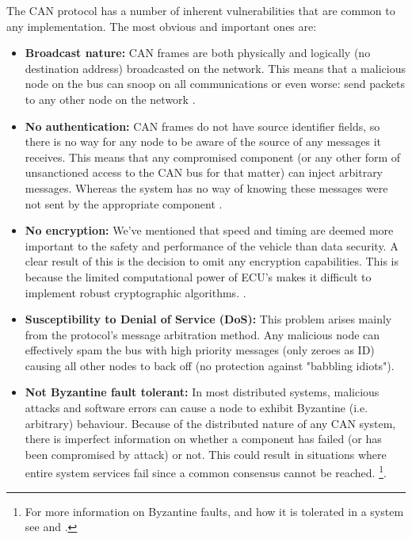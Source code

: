 The CAN protocol has a number of inherent vulnerabilities that are common to any implementation. The most obvious and important ones are:

\begin{itemize}
	\item \textbf{Broadcast nature:} CAN frames are both physically and logically (no destination address) broadcasted on the network. This means that a malicious node on the bus can snoop on all communications or even worse: send packets to any other node on the network \cite{Kosher}. 
	
	\item \textbf{No authentication:} CAN frames do not have source identifier fields, so there is no way for any node to be aware of the source of any messages it receives. This means that any compromised component (or any other form of unsanctioned access to the CAN bus for that matter) can inject arbitrary messages. Whereas the system has no way of knowing these messages were not sent by the appropriate component \cite{Kosher}\cite{CANissues}.
	
	\item \textbf{No encryption:} We've mentioned that speed and timing are deemed more important to the safety and performance of the vehicle than data security. A clear result of this is the decision to omit any encryption capabilities. This is because the limited  computational power of ECU's makes it difficult to implement robust cryptographic algorithms. \cite{CANissues}.  
	
	\item \textbf{Susceptibility to Denial of Service (DoS):} This problem arises mainly from the protocol's message arbitration method. Any malicious node can effectively spam the bus with high priority messages (only zeroes as ID) causing all other nodes to back off (no protection against "babbling idiots"\cite{Pike15})\cite{Kosher}.
	
	\item \textbf{Not Byzantine fault tolerant:} In most distributed systems, malicious attacks and software errors can cause a node to exhibit Byzantine (i.e. arbitrary) behaviour\cite{Byzantine}. Because of the distributed nature of any CAN system, there is imperfect information on whether a component has failed (or has been compromised by attack) or not. This could result in situations where entire system services fail since a common consensus cannot be reached\cite{wiki:ByzantineFault}. \footnote{For more information on Byzantine faults, and how it is tolerated in a system see \cite{Byzantine} and \cite{wiki:ByzantineFault}.}.
	
\end{itemize}

